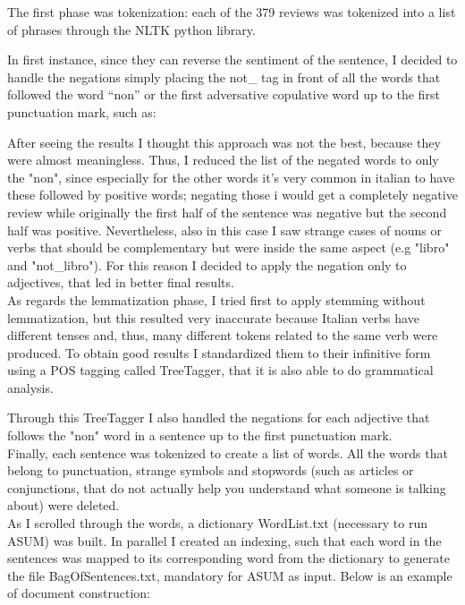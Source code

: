 \documentclass[a4paper,12pt]{article}
\begin{document}
\noindent The first phase was tokenization: each of the 379 reviews was tokenized into a list of phrases through the NLTK python library.

\noindent In first instance, since they can reverse the sentiment of the sentence, I decided to handle the negations simply placing the not\_ tag in front of all the words that followed the word “non” or the first adversative copulative word  up to the first punctuation mark, such as: 


\noindent After seeing the results I thought this approach was not the best, because they were almost meaningless. Thus, I reduced the list of the negated words to only the "non", since especially for the other words it's very common in italian to have these followed by positive words; negating those i would get a completely negative review while originally the first half of the sentence was negative but the second half was positive. Nevertheless, also in this case I saw strange cases of nouns or verbs that should be complementary but were inside the same aspect (e.g "libro" and "not\_libro"). For this reason I decided to apply the negation only to adjectives, that led in better final results. \\

\noindent As regards the lemmatization phase, I tried first to apply stemming without lemmatization, but this resulted very inaccurate because Italian verbs have different tenses and, thus, many different tokens related to the same verb
were produced. To obtain good results I standardized them to their infinitive form using a POS tagging called TreeTagger, that it is also able to do grammatical analysis. 

\noindent Through this TreeTagger I also handled the negations for each adjective that follows the "non" word in a sentence up to the first punctuation mark.\\ 

\noindent Finally, each sentence was tokenized to create a list of words. All the words that belong to punctuation, strange symbols and stopwords (such as articles or conjunctions, that do not actually help you understand what someone is talking about) were deleted. \\

\noindent As I scrolled through the words, a dictionary WordList.txt (necessary to run ASUM) was built. In parallel I created an indexing, such that each word in the sentences was mapped to its corresponding word from the dictionary to generate the file BagOfSentences.txt, mandatory for ASUM as input. Below is an example of document construction:
\end{document}
